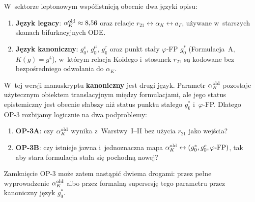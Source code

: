 \begin{remark}%
\label{rem:alphaK-legacy-status}
W~sektorze leptonowym wsp\'o\l{}istniej\k{a} obecnie dwa j\k{e}zyki opisu:
\begin{enumerate}[nosep]
  \item \textbf{J\k{e}zyk legacy}:
    $\alpha_K^{\rm old}\approx 8{,}56$ oraz relacje
    $r_{21} \leftrightarrow \alpha_K \leftrightarrow a_\Gamma$,
    u\.zywane w~starszych skanach bifurkacyjnych ODE.
  \item \textbf{J\k{e}zyk kanoniczny}:
    $g_0^e$, $g_0^\mu$, $g_0^\tau$ oraz punkt sta\l{}y
    $\varphi$-FP $g_0^*$ (Formulacja~A, $K(g)=g^4$),
    w~kt\'orym relacja Koidego i~stosunek $r_{21}$ s\k{a} kodowane
    bez bezpo\'sredniego odwo\l{}ania do $\alpha_K$.
\end{enumerate}
W~tej wersji manuskryptu \textbf{kanoniczny} jest drugi j\k{e}zyk.
Parametr $\alpha_K^{\rm old}$ pozostaje u\.zytecznym obiektem
translacyjnym mi\k{e}dzy formulacjami, ale jego status epistemiczny jest
obecnie s\l{}abszy ni\.z status punktu sta\l{}ego $g_0^*$ i~$\varphi$-FP.
Dlatego OP-3 rozbijamy logicznie na dwa podproblemy:
\begin{enumerate}[nosep,label=(\alph*)]
  \item \textbf{OP-3A}: czy $\alpha_K^{\rm old}$ wynika z~Warstwy~I--II
    bez u\.zycia $r_{21}$ jako wej\'scia?
  \item \textbf{OP-3B}: czy istnieje jawna i~jednoznaczna mapa
    $\alpha_K^{\rm old}\leftrightarrow(g_0^*,g_0^e,\varphi\text{-FP})$,
    tak aby stara formulacja sta\l{}a si\k{e} pochodn\k{a} nowej?
\end{enumerate}
Zamkni\k{e}cie OP-3 mo\.ze zatem nast\k{a}pi\'c dwiema drogami:
przez pe\l{}ne wyprowadzenie $\alpha_K^{\rm old}$ albo przez formaln\k{a}
supersesj\k{e} tego parametru przez kanoniczny j\k{e}zyk $g_0^*$.
\end{remark}

